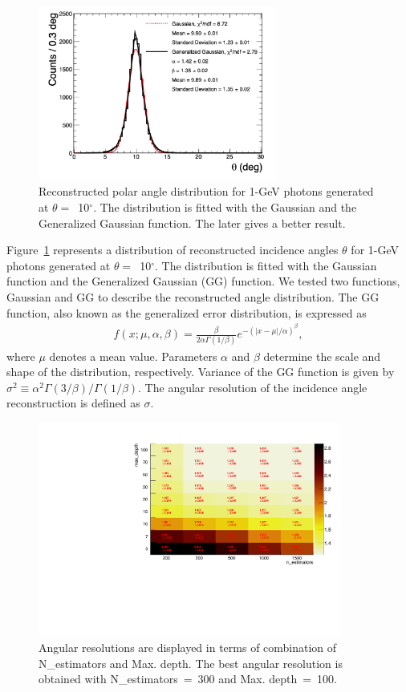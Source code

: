 \documentclass[preprint,12pt,times,a4paper]{elsarticle}
\begin{document}
\begin{figure}[!hbt]
\centering
\includegraphics[width=0.7\textwidth]{figures/GG_fit.jpg}
\caption{ Reconstructed polar angle distribution for 1-GeV photons generated at $\theta=$~10$^{\circ}$. The distribution is fitted with the Gaussian and the Generalized Gaussian function. The later gives a better result.}
\label{fig:angle_10degree}
\end{figure}

Figure~\ref{fig:angle_10degree} represents a distribution of reconstructed incidence angles $\theta$ for 1-GeV photons generated at $\theta=$~10$^{\circ}$. The distribution is fitted with the Gaussian function and the Generalized Gaussian (GG) function. We tested two functions, Gaussian and GG to describe the reconstructed angle distribution. The GG function, also known as the generalized error distribution, is expressed as
\begin{eqnarray} 
f(x; \mu, \alpha, \beta) = \frac{\beta}{2 \alpha \Gamma(1/\beta)}e^{-(|x-\mu|/\alpha)^\beta},
\label{eqn:gg}
\end{eqnarray}
where $\mu$ denotes a mean value. Parameters $\alpha$ and $\beta$ determine the scale and shape of the distribution, respectively. Variance of the GG function is given by $\sigma^2 \equiv \alpha^2 \Gamma(3/\beta) / \Gamma(1/\beta)$. The angular resolution of the incidence angle reconstruction is defined as $\sigma$.

\begin{figure}[!hbt]
\includegraphics[width=0.89\textwidth]{figures/optimization_plot.pdf}
\caption{Angular resolutions are displayed in terms of combination of N\_estimators and Max. depth. The best angular resolution is obtained with N\_estimators~=~300 and Max. depth~=~100. }
\label{fig:par_scan}
\end{figure}
\end{document}
